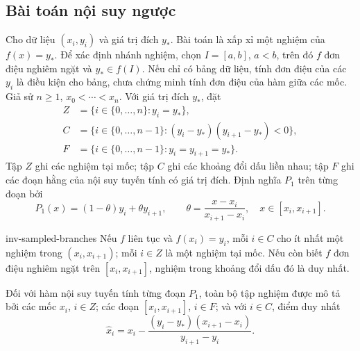 \documentclass[12pt,a4paper,oneside]{book}
\numberwithin{algorithm}{chapter}
\theoremstyle{definition}
\begin{document}
\subsection{Bài toán nội suy ngược}
Cho dữ liệu $(x_i,y_i)$ và giá trị đích $y_\ast$. Bài toán là xấp xỉ một nghiệm của $f(x)=y_\ast$. Để xác định nhánh nghiệm, chọn $I=[a,b]$, $a<b$, trên đó $f$ đơn điệu nghiêm ngặt và $y_\ast\in f(I)$. Nếu chỉ có bảng dữ liệu, tính đơn điệu của các $y_i$ là điều kiện cho bảng, chưa chứng minh tính đơn điệu của hàm giữa các mốc.
Giả sử $n\geq1$, $x_0<\cdots<x_n$. Với giá trị đích $y_\ast$, đặt
\[
\begin{aligned}
 Z&=\{i\in\{0,\ldots,n\}:y_i=y_\ast\},\\
 C&=\{i\in\{0,\ldots,n-1\}:(y_i-y_\ast)(y_{i+1}-y_\ast)<0\},\\
 F&=\{i\in\{0,\ldots,n-1\}:y_i=y_{i+1}=y_\ast\}.
\end{aligned}
\]
Tập $Z$ ghi các nghiệm tại mốc; tập $C$ ghi các khoảng đổi dấu liền nhau; tập $F$ ghi các đoạn hằng của nội suy tuyến tính có giá trị đích.
Định nghĩa $P_1$ trên từng đoạn bởi
\[
 P_1(x)=(1-\theta)y_i+\theta y_{i+1},\qquad
 \theta=\frac{x-x_i}{x_{i+1}-x_i},\quad x\in[x_i,x_{i+1}].
\]
\begin{menhde}{}{inv-sampled-branches}
Nếu $f$ liên tục và $f(x_i)=y_i$, mỗi $i\in C$ cho ít nhất một nghiệm trong $(x_i,x_{i+1})$; mỗi $i\in Z$ là một nghiệm tại mốc. Nếu còn biết $f$ đơn điệu nghiêm ngặt trên $[x_i,x_{i+1}]$, nghiệm trong khoảng đổi dấu đó là duy nhất.

Đối với hàm nội suy tuyến tính từng đoạn $P_1$, toàn bộ tập nghiệm được mô tả bởi các mốc $x_i$, $i\in Z$; các đoạn $[x_i,x_{i+1}]$, $i\in F$; và với $i\in C$, điểm duy nhất
\[
 \widehat x_i=x_i-\frac{(y_i-y_\ast)(x_{i+1}-x_i)}{y_{i+1}-y_i}.
\]
\end{menhde}
\end{document}
